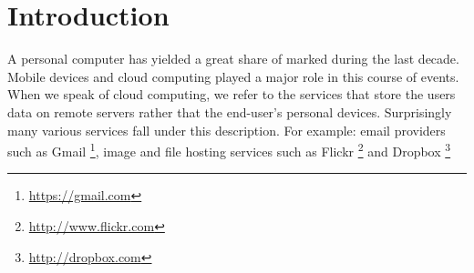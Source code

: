 \section{Introduction}

A personal computer has yielded a great share of marked during the
last decade. Mobile devices and cloud computing played a major role in
this course of events. When we speak of cloud computing, we refer to
the services that store the users data on remote servers rather that
the end-user's personal devices. Surprisingly many various services
fall under this description. For example: email providers such as Gmail
\footnote{\url{https://gmail.com}},
image and file hosting services such as Flickr
\footnote{\url{http://www.flickr.com}} and Dropbox
\footnote{\url{http://dropbox.com}}
